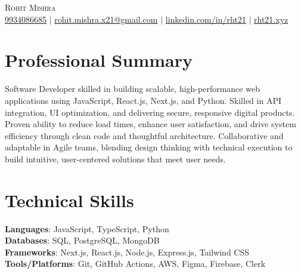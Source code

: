 \documentclass[letterpaper,11pt]{article}
\begin{document}

\begin{center}
    {\Huge \scshape Rohit Mishra} \\ \vspace{1pt}
    \vspace{5pt}
    \href{tel:+919934086685}{9934086685} $|$
    \href{mailto:rohit.mishra.x21@gmail.com}{ rohit.mishra.x21@gmail.com} $|$
    \href{https://www.linkedin.com/in/rht21/}{ linkedin.com/in/rht21} $|$
    \href{https://rht21.xyz}{ rht21.xyz}
    \vspace{-8pt}
\end{center}

\section{Professional Summary}
\small{Software Developer skilled in building scalable, high-performance web applications using JavaScript, React.js, Next.js, and Python. Skilled in API integration, UI optimization, and delivering secure, responsive digital products. Proven ability to reduce load times, enhance user satisfaction, and drive system efficiency through clean code and thoughtful architecture. Collaborative and adaptable in Agile teams, blending design thinking with technical execution to build intuitive, user-centered solutions that meet user needs.}

\vspace{-10pt}

\section{Technical Skills}
 \begin{itemize}[leftmargin=0.15in, label={}]
    {\item{
     \textbf{Languages}{: JavaScript, TypeScript, Python} \\
     \vspace{1pt}
     \textbf{Databases}{: SQL, PostgreSQL, MongoDB} \\
     \vspace{1pt}
     \textbf{Frameworks}{: Next.js, React.js, Node.js, Express.js, Tailwind CSS} \\
     \vspace{1pt}
     \textbf{Tools/Platforms}{: Git, GitHub Actions, AWS, Figma, Firebase, Clerk} }}
 \end{itemize}
 
\end{document}
